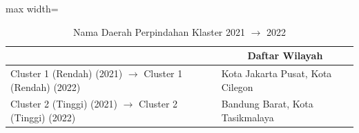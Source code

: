 \begin{table}[H]
\centering
\caption{Nama Daerah Perpindahan Klaster 2021 \(\rightarrow\) 2022} \label{tab:sample1transname2021x2022}
\begin{adjustbox}{max width=\textwidth}
\begin{tabular}{|>{\centering\arraybackslash}p{4cm}|p{10cm}|}
\hline
\multicolumn{1}{|c|}{\textbf{Kategori}} & \multicolumn{1}{c|}{\textbf{Daftar Wilayah}} \\
\hline
Cluster 1 (Rendah) (2021) \(\rightarrow\) Cluster 1 (Rendah) (2022) & Kota Jakarta Pusat, Kota Cilegon \\
\hline
Cluster 2 (Tinggi) (2021) \(\rightarrow\) Cluster 2 (Tinggi) (2022) & Bandung Barat, Kota Tasikmalaya \\
\hline
\end{tabular}
\end{adjustbox}
\end{table}